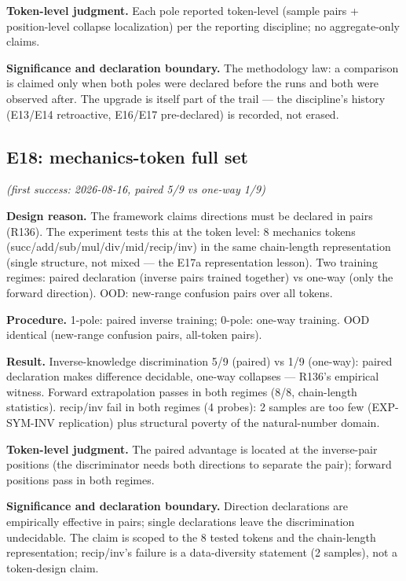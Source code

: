 \documentclass[sigplan,10pt,anonymous,review]{acmart}
\begin{document}
\textbf{Token-level judgment.} Each pole reported token-level (sample
pairs + position-level collapse localization) per the reporting
discipline; no aggregate-only claims.

\textbf{Significance and declaration boundary.} The methodology law: a
comparison is claimed only when both poles were declared before the runs
and both were observed after. The upgrade is itself part of the trail ---
the discipline's history (E13/E14 retroactive, E16/E17 pre-declared) is
recorded, not erased.

\subsection{E18: mechanics-token full set}\hfill\textit{(first success: 2026-08-16, paired 5/9 vs one-way 1/9)}

\textbf{Design reason.} The framework claims directions must be declared in
pairs (R136). The experiment tests this at the token level: 8 mechanics
tokens (succ/add/sub/mul/div/mid/recip/inv) in the same chain-length
representation (single structure, not mixed --- the E17a representation
lesson). Two training regimes: paired declaration (inverse pairs trained
together) vs one-way (only the forward direction). OOD: new-range
confusion pairs over all tokens.

\textbf{Procedure.} 1-pole: paired inverse training; 0-pole: one-way
training. OOD identical (new-range confusion pairs, all-token pairs).

\textbf{Result.} Inverse-knowledge discrimination 5/9 (paired) vs 1/9
(one-way): paired declaration makes difference decidable, one-way
collapses --- R136's empirical witness. Forward extrapolation passes in
both regimes (8/8, chain-length statistics). recip/inv fail in both
regimes (4 probes): 2 samples are too few (EXP-SYM-INV replication) plus
structural poverty of the natural-number domain.

\textbf{Token-level judgment.} The paired advantage is located at the
inverse-pair positions (the discriminator needs both directions to
separate the pair); forward positions pass in both regimes.

\textbf{Significance and declaration boundary.} Direction declarations
are empirically effective in pairs; single declarations leave the
discrimination undecidable. The claim is scoped to the 8 tested tokens and
the chain-length representation; recip/inv's failure is a data-diversity
statement (2 samples), not a token-design claim.
\end{document}
